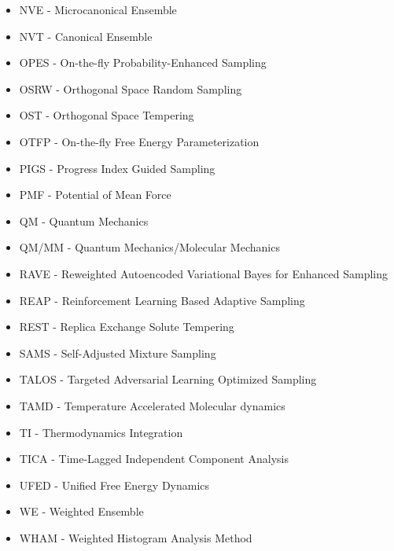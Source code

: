 \documentclass[9pt,review]{livecoms}
\begin{document}
\begin{itemize}
    \item NVE - Microcanonical Ensemble
    \item NVT - Canonical Ensemble
    \item OPES - On-the-fly Probability-Enhanced Sampling
    \item OSRW - Orthogonal Space Random Sampling
    \item OST - Orthogonal Space Tempering
    \item OTFP - On-the-fly Free Energy Parameterization
    \item PIGS - Progress Index Guided Sampling
    \item PMF - Potential of Mean Force
    \item QM - Quantum Mechanics
    \item QM/MM - Quantum Mechanics/Molecular Mechanics
    \item RAVE - Reweighted Autoencoded Variational Bayes for Enhanced Sampling
    \item REAP - Reinforcement Learning Based Adaptive Sampling
    \item REST - Replica Exchange Solute Tempering
    \item SAMS - Self-Adjusted Mixture Sampling
    \item TALOS - Targeted Adversarial Learning Optimized Sampling
    \item TAMD - Temperature Accelerated Molecular dynamics
    \item TI - Thermodynamics Integration
    \item TICA - Time-Lagged Independent Component Analysis
    \item UFED - Unified Free Energy Dynamics
    \item WE - Weighted Ensemble
    \item WHAM - Weighted Histogram Analysis Method
\end{itemize}



%


%
%
\end{document}
